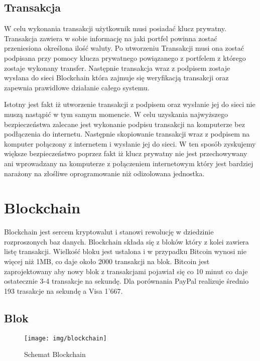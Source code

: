 \documentclass[conference]{IEEEtran}
\begin{document}
\subsection{Transakcja}

W celu wykonania transakcji użytkownik musi posiadać klucz prywatny. Transakcja zawiera w sobie informację na jaki
portfel powinna zostać przeniesiona określona ilość waluty. Po utworzeniu Transakcji musi ona zostać podpisana przy
pomocy klucza prywatnego powiązanego z portfelem z którego zostaje wykonany transfer. Następnie transakcja wraz z
podpisem zostaje wysłana do sieci Blockchain która zajmuje się weryfikacją transakcji oraz zapewnia prawidłowe działanie
całego systemu.

Istotny jest fakt iż utworzenie transakcji z podpisem oraz wysłanie jej do sieci nie muszą nastąpić w tym samym
momencie. W celu uzyskania najwyższego bezpieczeństwa zalecane jest wykonanie podpisu transakcji na komputerze bez
podłączenia do internetu. Następnie skopiowanie transakcji wraz z podpisem na komputer połączony z internetem i wysłanie
jej do sieci. W ten sposób zyskujemy większe bezpieczeństwo poprzez fakt iż klucz prywatny nie jest przechowywany ani
wprowadzany na komputerze z połączeniem internetowym który jest bardziej narażony na złośliwe oprogramowanie niż
odizolowana jednostka.

\section{Blockchain}

Blockchain jest sercem kryptowalut i stanowi rewolucję w dziedzinie rozproszonych baz danych. Blockchain składa się z
bloków który z kolei zawiera listę transakcji. Wielkość bloku jest ustalona i w przypadku Bitcoin wynosi nie więcej niż
1MB, co daje około 2000 transakcji na blok.\cite{transakcje} Bitcoin jest zaprojektowany aby nowy blok z transakcjami
pojawiał się co 10 minut co daje ostatecznie 3-4 transakcje na sekundę. Dla porównania PayPal realizuje średnio 193
trasakcje na sekundę a Visa 1'667.\cite{porownanieTransakcji}

\subsection{Blok}

\begin{figure}[!t]
  \centering
  \texttt{[image: img/blockchain]}
  \caption{Schemat Blockchain}
  \label{fig:blockchain}
\end{figure}
\end{document}
